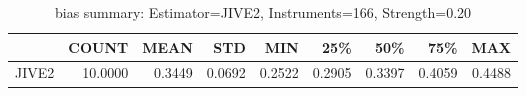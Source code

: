 \begin{table}[ht]
\centering
\caption{bias summary: Estimator=JIVE2, Instruments=166, Strength=0.20}
\begin{tabular}{lrrrrrrrr}
\toprule
 & COUNT & MEAN & STD & MIN & 25\% & 50\% & 75\% & MAX \\
\midrule
JIVE2 & 10.0000 & 0.3449 & 0.0692 & 0.2522 & 0.2905 & 0.3397 & 0.4059 & 0.4488 \\
\bottomrule
\end{tabular}
\end{table}
